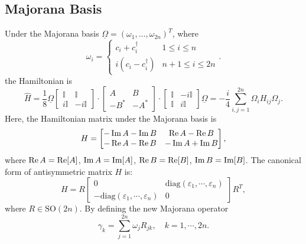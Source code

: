 \documentclass{SciPost}
\begin{document}
\subsection{Majorana Basis}
Under the Majorana basis $\underline\Omega=(\omega_1,\dots,\omega_{2n})^T$, where
\begin{equation}
	\omega_i = \begin{cases}
		c_i + c_i^\dagger & 1 \le i \le n \\
		i(c_i-c_i^\dagger) & n+1 \le i \le 2n
	\end{cases}.
\end{equation}
the Hamiltonian is
\begin{equation}
	\hat H = \frac{1}{8} \underline\Omega 
	\begin{bmatrix}
		\mathbb{I} & \mathbb{I} \\ i\mathbb{I} & -i\mathbb{I}
	\end{bmatrix}\cdot
	\begin{bmatrix}
		A & B \\ -B^* & -A^*
	\end{bmatrix}\cdot
	\begin{bmatrix}
		\mathbb{I} & -i\mathbb{I} \\ \mathbb{I} & i\mathbb{I}
	\end{bmatrix}
	\underline\Omega 
	= -\frac{i}{4} \sum_{i,j=1}^{2n} \Omega_i H_{ij} \Omega_j.
\end{equation}
Here, the Hamiltonian matrix under the Majorana basis is
\begin{equation}
	H = \begin{bmatrix}
		-\operatorname{Im}{A} - \operatorname{Im}{B} & \operatorname{Re}{A} - \operatorname{Re}{B} \\
    	-\operatorname{Re}{A} - \operatorname{Re}{B} &  -\operatorname{Im}{A} + \operatorname{Im}{B}
	\end{bmatrix},
\end{equation}
where $\operatorname{Re}{A} = \mathrm{Re}[A]$, $\operatorname{Im}{A} = \mathrm{Im}[A]$, $\operatorname{Re}{B} = \mathrm{Re}[B]$, $\operatorname{Im}{B} = \mathrm{Im}[B]$. 
The canonical form of antisymmetric matrix $H$ is:
\begin{equation}
	H = R \begin{bmatrix}
		0 & \mathrm{diag}(\varepsilon_1,\cdots,\varepsilon_n) \\ 
		-\mathrm{diag}(\varepsilon_1,\cdots,\varepsilon_n) & 0
	\end{bmatrix} R^T,
\end{equation}
where $R \in \mathrm{SO}(2n)$.
By defining the new Majorana operator 
\begin{equation}
	\gamma_k = \sum_{j=1}^{2n} \omega_j R_{jk},\quad
	k=1,\cdots,2n.
\end{equation}
\end{document}
